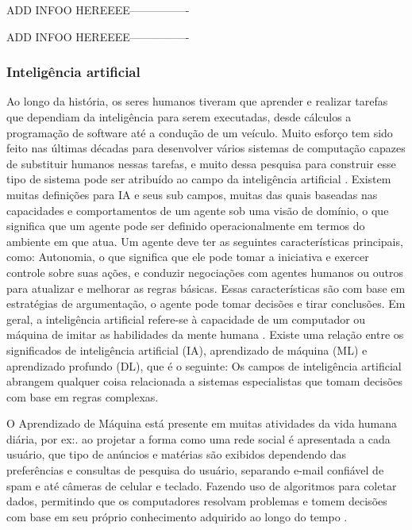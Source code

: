 ADD INFOO HEREEEE----------------

ADD INFOO HEREEEE----------------


\subsubsection{Inteligência artificial}

Ao longo da história, os seres humanos tiveram que aprender e realizar tarefas que dependiam da inteligência para serem executadas, desde cálculos a programação de software até a condução de um veículo. Muito esforço tem sido feito nas últimas décadas para desenvolver vários sistemas de computação capazes de substituir humanos nessas tarefas, e muito dessa pesquisa para construir esse tipo de sistema pode ser atribuído ao campo da inteligência artificial \cite{caio}. 
Existem muitas definições para IA e seus sub campos, muitas das quais baseadas nas capacidades e comportamentos de um agente sob uma visão de domínio, o que significa que um agente pode ser definido operacionalmente em termos do ambiente em que atua.
Um agente deve ter as seguintes características principais, como: Autonomia, o que significa que ele pode tomar a iniciativa e exercer controle sobre suas ações, e conduzir negociações com agentes humanos ou outros para atualizar e melhorar as regras básicas.
Essas características são com base em estratégias de argumentação, o agente pode tomar decisões e tirar conclusões. Em geral, a inteligência artificial refere-se à capacidade de um computador ou máquina de imitar as habilidades da mente humana \cite{software-ia}. Existe uma relação entre os significados de inteligência artificial (IA), aprendizado de máquina (ML) e aprendizado profundo (DL), que é o seguinte: Os campos de inteligência artificial abrangem qualquer coisa relacionada a sistemas especialistas que tomam decisões com base em regras complexas.


O Aprendizado de Máquina está presente em muitas atividades da vida humana diária, por ex:. ao projetar a forma como uma rede social é apresentada a cada usuário, que tipo de anúncios e matérias são exibidos dependendo das preferências e consultas de pesquisa do usuário, separando e-mail confiável de spam e até câmeras de celular e teclado. Fazendo uso de algoritmos para coletar dados, permitindo que os computadores resolvam problemas e tomem decisões com base em seu próprio conhecimento adquirido ao longo do tempo \cite{caio}.

